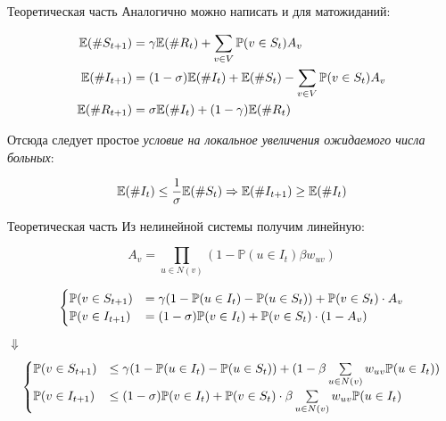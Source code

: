 	\begin{frame}{Теоретическая часть}
		Аналогично можно написать и для матожиданий:
		
		\begin{align*}
			\mathbb{E}(\#S_{t+1}) &= \gamma \mathbb{E}(\#R_{t}) + \sum\limits_{v \in V} \mathbb{P}(v \in S_t) A_v \\
			\mathbb{E}(\#I_{t+1}) &= (1 - \sigma) \mathbb{E}(\#I_{t}) + \mathbb{E}(\#S_{t}) - \sum\limits_{v \in V} \mathbb{P}(v \in S_t) A_v \\
			\mathbb{E}(\#R_{t+1}) &=  \sigma \mathbb{E}(\# I_t) + (1 - \gamma) \mathbb{E}(\#R_{t})
		\end{align*}
		
		Отсюда следует простое \textit{условие на локальное увеличения ожидаемого числа больных}:
		
		\begin{equation*}
			\mathbb{E}(\#I_{t}) \le \frac{1}{\sigma} \mathbb{E}(\#S_{t}) \Rightarrow \mathbb{E}(\#I_{t+1}) \ge \mathbb{E}(\#I_{t})
		\end{equation*}
		
	\end{frame}

	\begin{frame}{Теоретическая часть}
	 Из нелинейной системы получим линейную:
	 
	 	\[ A_v = \prod\limits_{u \in N(v)} (1 - \mathbb{P}(u \in I_t) \beta w_{uv}) \]
		
		\begin{equation*}
			\begin{cases}
				\mathbb{P}(v \in S_{t+1}) &= \gamma (1 - \mathbb{P}(u \in I_t) - \mathbb{P}(u \in S_t)) + \mathbb{P}(v \in S_t) \cdot A_v \\
				\mathbb{P}(v \in I_{t+1}) &= (1 - \sigma) \mathbb{P}(v \in I_t) + \mathbb{P}(v \in S_t) \cdot (1 - A_v)
			\end{cases}
		\end{equation*}
	\centering $ \Downarrow $
		\begin{equation*}
			\begin{cases}
				\mathbb{P}(v \in S_{t+1}) &\le \gamma (1 - \mathbb{P}(u \in I_t) - \mathbb{P}(u \in S_t)) + (1 - \beta \sum\limits_{u \in N(v)} w_{uv} \mathbb{P}(u \in I_t)) \\
				\mathbb{P}(v \in I_{t+1}) &\le (1 - \sigma) \mathbb{P}(v \in I_t) + \mathbb{P}(v \in S_t) \cdot \beta \sum\limits_{u \in N(v)} w_{uv} \mathbb{P}(u \in I_t) 
			\end{cases}
		\end{equation*}
			\end{frame}

